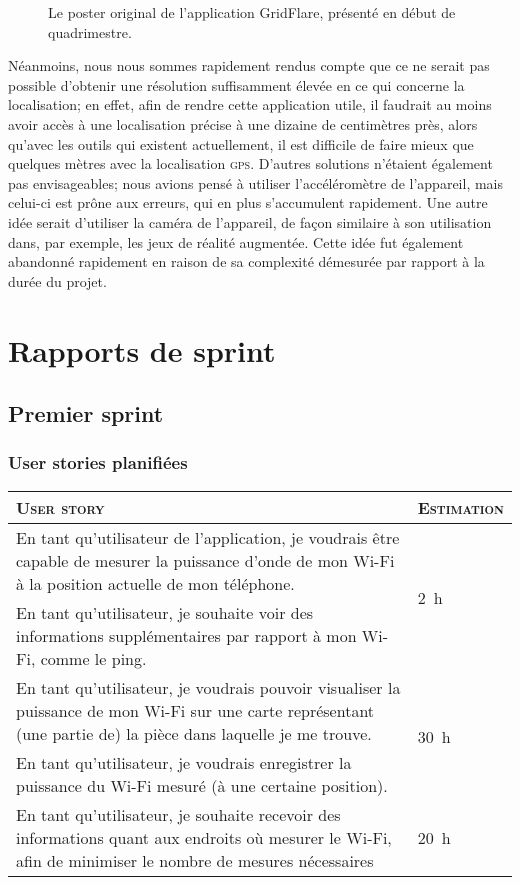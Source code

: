 \documentclass{elsarticle}
\newcommand{\est}[1]{\multirow{2}{*}{\SI{#1}{\hour}}}
\begin{document}
\begin{figure}[!htbp]
	\centering
	\caption{Le poster original de l'application GridFlare, présenté en début de quadrimestre.}
	\label{fig:poster}
\end{figure}

Néanmoins, nous nous sommes rapidement rendus compte que ce ne serait pas possible d'obtenir une résolution suffisamment élevée en ce qui concerne la localisation; en effet, afin de rendre cette application utile, il faudrait au moins avoir accès à une localisation précise à une dizaine de centimètres près, alors qu'avec les outils qui existent actuellement, il est difficile de faire mieux que quelques mètres avec la localisation \textsc{gps}.
D'autres solutions n'étaient également pas envisageables; nous avions pensé à utiliser l'accéléromètre de l'appareil, mais celui-ci est prône aux erreurs, qui en plus s'accumulent rapidement.
Une autre idée serait d'utiliser la caméra de l'appareil, de façon similaire à son utilisation dans, par exemple, les jeux de réalité augmentée.
Cette idée fut également abandonné rapidement en raison de sa complexité démesurée par rapport à la durée du projet.

\section{Rapports de sprint}
\subsection{Premier sprint}
\subsubsection{User stories planifiées}
\begin{table}[H]
	\centering
	\begin{tabular}{p{14cm}m{2cm}}
		\toprule
		\textsc{User story} & \textsc{Estimation}\\
		\midrule
		En tant qu'utilisateur de l'application, je voudrais être capable de mesurer la puissance d'onde de mon Wi-Fi à la position actuelle de mon téléphone. & \est{2}\\
		\midrule
		En tant qu'utilisateur, je souhaite voir des informations supplémentaires par rapport à mon Wi-Fi, comme le ping. & \est{5}\\
		\midrule
		En tant qu'utilisateur, je voudrais pouvoir visualiser la puissance de mon Wi-Fi sur une carte représentant (une partie de) la pièce dans laquelle je me trouve. & \est{30}\\
		\midrule
		En tant qu'utilisateur, je voudrais enregistrer la puissance du Wi-Fi mesuré (à une certaine position). & \est{10}\\
		\midrule
		En tant qu'utilisateur, je souhaite recevoir des informations quant aux endroits où mesurer le Wi-Fi, afin de minimiser le nombre de mesures nécessaires & \est{20}\\
		\bottomrule
	\end{tabular}
\end{table}
\end{document}

